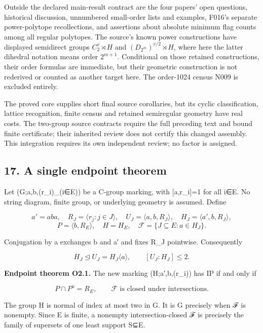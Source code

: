 \documentclass[
  10pt,
  letterpaper,
]{article}
\newcounter{none} %
\begin{document}
Outside the declared main-result contract are the four papers' open
questions, historical discussion, unnumbered small-order lists and
examples, F016's separate power-polytope recollections, and assertions
about absolute minimum flag counts among all regular polytopes. The
source's known power constructions have displayed semidirect groups
\(C_2^v\rtimes H\) and \((D_{2^m})^{v/2}\rtimes H\), where here the
latter dihedral notation means order \(2^{m+1}\). Conditional on those
retained constructions, their order formulas are immediate, but their
geometric construction is not rederived or counted as another target
here. The order-1024 census N009 is excluded entirely.

The proved core supplies short final source corollaries, but its cyclic
classification, lattice recognition, finite census and retained
semiregular geometry have real costs. The two-group source contracts
require the full preceding text and bound finite certificate; their
inherited review does not certify this changed assembly. This
integration requires its own independent review; no factor is assigned.

\subsection{17. A single endpoint
theorem}\label{a-single-endpoint-theorem}

Let (G;a,b,(r\_i)\_(i∈E)) be a C-group marking, with {[}a,r\_i{]}=1 for
all i∈E. No string diagram, finite group, or underlying geometry is
assumed. Define

\[
a'=aba,\quad R_J=\langle r_j:j\in J\rangle,\quad
U_J=\langle a,b,R_J\rangle,\quad H_J=\langle a',b,R_J\rangle,
\] \[
P=\langle b,R_E\rangle,\quad H=H_E,\quad
\mathcal F=\{J\subseteq E:a\in H_J\}.
\tag{O3}
\]

Conjugation by a exchanges b and a′ and fixes R\_J pointwise.
Consequently

\[
H_J\trianglelefteq U_J=H_J\langle a\rangle,
\qquad [U_J:H_J]\le2.
\tag{O4}
\]

\textbf{Endpoint theorem O2.1.} The new marking (H;a′,b,(r\_i)) has IP
if and only if

\[
P\cap P^a=R_E,
\qquad \mathcal F\text{ is closed under intersections}.
\tag{O5}
\]

The group H is normal of index at most two in G. It is G precisely when
ℱ is nonempty. Since E is finite, a nonempty intersection-closed ℱ is
precisely the family of supersets of one least support S⊆E.
\end{document}

